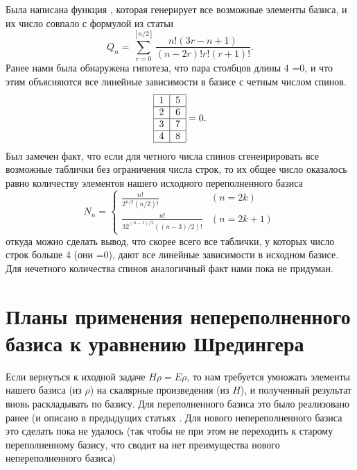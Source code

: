 \documentclass[]{article}
\begin{document}
Была написана функция \cite{basis_gen_code}, которая генерирует все возможные элементы базиса, и их число совпало с формулой из статьи
$$Q_n = \sum_{r=0}^{[n/2]}\frac{n!(3r-n+1)}{(n-2r)!r!(r+1)!}.$$
Ранее нами была обнаружена гипотеза, что пара столбцов длины 4 =0, и что этим объясняются все линейные зависимости в базисе с четным числом спинов.
$$ \begin{tabular}{ |l|l| }
\hline
1 & 5 \\ \hline
2 & 6\\ \hline
3 & 7\\ \hline
4 & 8\\
\hline
\end{tabular}=0 .
$$
Был замечен факт, что если для четного числа спинов сгененрировать все возможные таблички без ограничения числа строк,
то их общее число оказалось равно количеству элементов нашего исходного переполненного базиса
$$N_n=\begin{cases}
\frac{n!}{2^{n/2}(n/2)!} & (n=2k)\\
\frac{n!}{3\dot 2^{(n-1)/2}((n-3)/2)!} & (n=2k+1)
\end{cases}$$
откуда можно сделать вывод, что скорее всего все таблички, у которых число строк больше 4 (они =0), дают все линейные зависимости в исходном базисе.
Для нечетного количества спинов аналогичный факт нами пока не придуман.

\section{Планы применения непереполненного базиса к уравнению Шредингера}
Если вернуться к иходной задаче $H \rho = E \rho$, то 
нам требуется умножать элементы нашего базиса (из $\rho$) на скалярные произведения (из $H$), и полученный результат вновь раскладывать по базису.
Для переполненного базиса это было реализовано ранее (и описано в предыдущих статьях \cite{variational}.
Для нового непереполненного базиса это сделать пока не удалось (так чтобы не при этом не переходить к старому переполненному базису, что сводит на нет преимущества нового непереполненного базиса)
\end{document}
